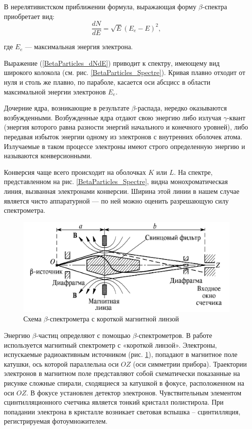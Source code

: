 \documentclass{article}
\begin{document}
	В нерелятивистском приближении формула, выражающая форму $\beta$-спектра приобретает вид:
	\begin{equation}
		\frac{dN}{dE} = \sqrt{E}(E_e - E)^2,
		\label{BetaParticles_dNdE}
	\end{equation}

	\noindent где $E_e$ — максимальная энергия электрона.
	
	Выражение (\ref{BetaParticles_dNdE}) приводит к спектру, имеющему вид широкого колокола (см. рис. \ref{BetaParticles_Spectre}). Кривая плавно отходит от нуля и столь же плавно, по параболе, касается оси абсцисс в области максимальной энергии электронов $E_e$.
	
	
	Дочерние ядра, возникающие в результате $\beta$-распада, нередко оказываются возбужденными. Возбужденные ядра отдают свою энергию либо излучая $\gamma$-квант (энергия которого равна разности энергий начального и конечного уровней), либо передавая избыток энергии одному из электронов с внутренних оболочек атома. Излучаемые в таком процессе электроны имеют строго определенную энергию и называются конверсионными.

	Конверсия чаще всего происходит на оболочках $K$ или $L$. На спектре, представленном на рис. \ref{BetaParticles_Spectre}, видна монохроматическая линия, вызванная электронами конверсии. Ширина этой линии в нашем случае является чисто аппаратурной — по ней можно оценить разрешающую силу спектрометра.
	
	\begin{figure}[h!]
		\centering
		\includegraphics[width=\linewidth]{pic2.PNG}
		\caption{Схема $\beta$-спектрометра с короткой магнитной линзой}
		\label{BetaParticles_Scheme}
	\end{figure}

	Энергию $\beta$-частиц определяют с помощью $\beta$-спектрометров. В работе используется магнитный спектрометр с «короткой линзой». Электроны, испускаемые радиоактивным источником (рис. \ref{BetaParticles_Scheme}), попадают в магнитное поле катушки, ось которой параллельна оси $OZ$ (оси симметрии прибора). Траектории электронов в магнитном поле представляют собой схематически показанные на рисунке сложные спирали, сходящиеся за катушкой в фокусе, расположенном на оси $OZ$. В фокусе установлен детектор электронов. Чувствительным элементом сцинтилляционного счетчика является тонкий кристалл полистирола. При попадании электрона в кристалле возникает световая вспышка -- сцинтилляция, регистрируемая фотоумножителем.
	
\end{document}
